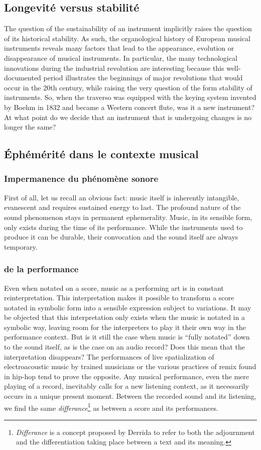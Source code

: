 \subsection{Longevité versus stabilité}
The question of the sustainability of an instrument implicitly raises the question of its historical stability. As such, the organological history of European musical instruments reveals many factors that lead to the appearance, evolution or disappearance of musical instruments. In particular, the many technological innovations during the industrial revolution are interesting because this well-documented period illustrates the beginnings of major revolutions that would occur in the 20th century, while raising the very question of the form stability of instruments. So, when the traverso was equipped with the keying system invented by Boehm in 1832 and became a Western concert flute, was it a new instrument? At what point do we decide that an instrument that is undergoing changes is no longer the same?

\subsection{Éphémérité dans le contexte musical}
\subsubsection{Impermanence du phénomène sonore}
First of all, let us recall an obvious fact: music itself is inherently intangible, evanescent and requires sustained energy to last. The profound nature of the sound phenomenon stays in permanent ephemerality. Music, in its sensible form, only exists during the time of its performance. While the instruments used to produce it can be durable, their convocation and the sound itself are always temporary. 

\subsubsection{de la performance}
Even when notated on a score, music as a performing art is in constant reinterpretation. This interpretation makes it possible to transform a score notated in symbolic form into a sensible expression subject to variations. It may be objected that this interpretation only exists when the music is notated in a symbolic way, leaving room for the interpreters to play it their own way in the performance context. But is it still the case when music is “fully notated” down to the sound itself, as is the case on an audio record? Does this mean that the interpretation disappears? The performances of live spatialization of electroacoustic music by trained musicians or the various practices of remix found in hip-hop tend to prove the opposite. Any musical performance, even the mere playing of a record, inevitably calls for a new listening context, as it necessarily occurs in a unique present moment. Between the recorded sound and its listening, we find the same \textit{differance}\footnote{\textit{Differance} is a concept proposed by Derrida \cite{derrida_lecriture_2014} to refer to both the adjournment and the differentiation taking place between a text and its meaning.} as between a score and its performances.

